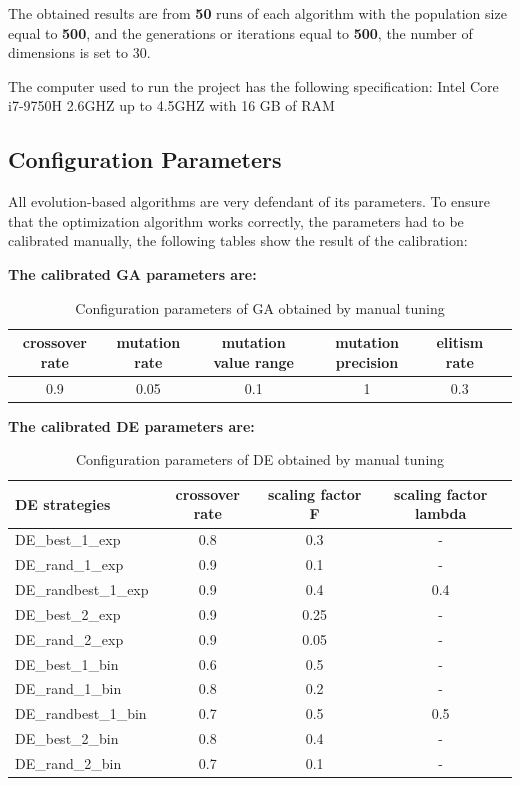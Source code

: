 \documentclass[12pt]{article}
\begin{document}
    The obtained results are from \textbf{50} runs of each algorithm with the population size equal to \textbf{500}, and the generations or iterations equal to \textbf{500}, the number of dimensions is set to 30.

The computer used to run the project has the following specification: Intel Core i7-9750H 2.6GHZ up to 4.5GHZ with 16 GB of RAM

  
      
\subsection{Configuration Parameters}
All evolution-based algorithms are very defendant of its parameters. To ensure that the optimization algorithm works correctly,  the parameters had to be calibrated manually,
the following tables show the result of the calibration:






\textbf{The calibrated GA parameters are:}
\begin{table}[H]    
\centering
\footnotesize
\begin{tabular}{cccccc}

\hline
crossover rate&    mutation rate&    mutation value range&     mutation precision&     elitism rate\\
\hline

0.9&    0.05&    0.1&    1&    0.3&\\

\hline 
\end{tabular} 

\caption{Configuration parameters of GA obtained by manual tuning} 
\end{table}



\textbf{The calibrated DE parameters are:}

\begin{table}[H]    
\centering
\small 
\begin{tabular}{lccc}

\hline
DE strategies & crossover rate& scaling factor F& scaling factor lambda\\
\hline 
DE\_best\_1\_exp & 0.8 &    0.3&    - \\
DE\_rand\_1\_exp& 0.9&    0.1&    - \\
DE\_randbest\_1\_exp& 0.9&    0.4&    0.4 \\
DE\_best\_2\_exp& 0.9&    0.25&    - \\
DE\_rand\_2\_exp& 0.9&    0.05&    - \\
DE\_best\_1\_bin& 0.6&    0.5&    - \\
DE\_rand\_1\_bin& 0.8&    0.2&    - \\
DE\_randbest\_1\_bin& 0.7&    0.5&    0.5\\
DE\_best\_2\_bin& 0.8&    0.4&    - \\
DE\_rand\_2\_bin& 0.7&    0.1&    - \\
\hline 
\end{tabular} 
\caption{Configuration parameters of DE obtained by manual tuning} 
\end{table}
\end{document}

